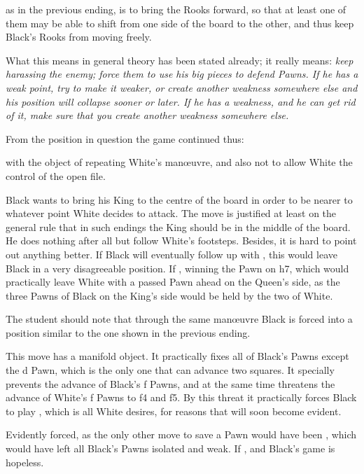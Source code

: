 \documentclass[11pt,a4paper]{book}
\begin{document}
as in the previous ending, is to bring the Rooks forward, so that at least one of them may be able to shift from one side of the board to the other, and thus keep Black's Rooks from moving freely.

What this means in general theory has been stated already; it really means: \emph{keep harassing the enemy; force them to use his big pieces to defend Pawns. If he has a weak point, try to make it weaker, or create another weakness somewhere else and his position will collapse sooner or later. If he has a weakness, and he can get rid of it, make sure that you create another weakness somewhere else.}

From the position in question the game continued thus:

 with the object of repeating White's manœuvre, and also not to allow White the control of the open file.

 Black wants to bring his King to the centre of the board in order to be nearer to whatever point White decides to attack. The move is justified at least on the general rule that in such endings the King should be in the middle of the board. He does nothing after all but follow White's footsteps. Besides, it is hard to point out anything better. If  Black will eventually follow up with , this would leave Black in a very disagreeable position. If , winning the Pawn on h7, which would practically leave White with a passed Pawn ahead on the Queen's side, as the three Pawns of Black on the King's side would be held by the two of White.

 The student should note that through the same manœuvre Black is forced into a position similar to the one shown in the previous ending.

 This move has a manifold object. It practically fixes all of Black's Pawns except the d Pawn, which is the only one that can advance two squares. It specially prevents the advance of Black's f Pawns, and at the same time threatens the advance of White's f Pawns to f4 and f5. By this threat it practically forces Black to play , which is all White desires, for reasons that will soon become evident.

 Evidently forced, as the only other move to save a Pawn would have been , which would have left all Black's Pawns isolated and weak. If , and Black's game is hopeless.
\end{document}

